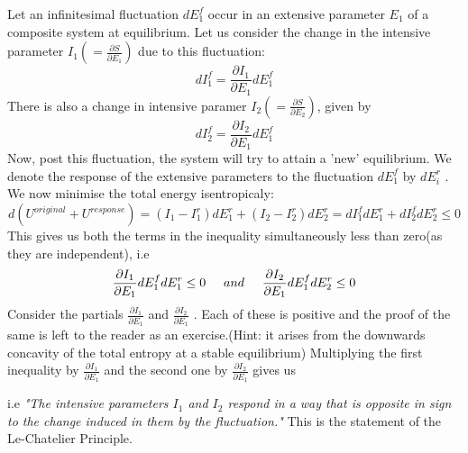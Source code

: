 \documentclass[oneside]{book}
\begin{document}
Let an infinitesimal fluctuation $dE_1^f$ occur in an extensive parameter $E_1$ of a composite system at equilibrium. Let us consider the change in the intensive parameter $I_1 (= \frac{\partial S}{\partial E_1})$ due to this fluctuation:
\[ dI_1^f =  \frac{\partial I_1}{\partial E_1}dE_1^f\]
There is also a change in intensive paramer $I_2 (= \frac{\partial S}{\partial E_2})$, given by 
\[ dI_2^f =  \frac{\partial I_2}{\partial E_1}dE_1^f\]
Now, post this fluctuation, the system will try to attain a 'new' equilibrium. We denote the response of the extensive parameters to the fluctuation $dE_1^f$ by $dE_i^r$ . We now minimise the total energy isentropicaly:
\[d(U^{original} + U^{response}) = (I_1 - I_1^r)dE_1^r + (I_2 - I_2^r)dE_2^r= dI_1^fdE_1^r + dI_2^fdE_2^r \leq 0\]
This gives us both the terms in the inequality simultaneously less than zero(as they are independent), i.e
\[ \frac{\partial I_1}{\partial E_1}dE_1^fdE_1^r \leq 0 \hspace{0.5cm} and \hspace{0.5cm} \frac{\partial I_2}{\partial E_1}dE_1^fdE_2^r \leq 0\]
Consider the partials $\frac{\partial I_1}{\partial E_1}$  and $\frac{\partial I_2}{\partial E_1}$ . Each of these is positive and the proof of the same is left to the reader as an exercise.(Hint: it arises from the downwards concavity of the total entropy at a stable equilibrium)
Multiplying the first inequality by $\frac{\partial I_1}{\partial E_1}$ and the second one by $\frac{\partial I_2}{\partial E_1}$ gives us
 \begin{center}
  \end{center}
  i.e \emph{"The intensive parameters $I_1$ and $I_2$ respond in a way that is opposite in sign to the change induced in them by the fluctuation."} This is the statement of the Le-Chatelier Principle.
\end{document}
